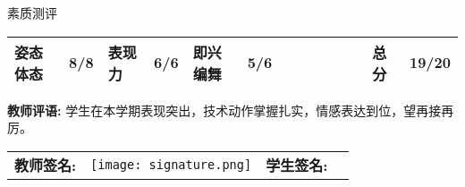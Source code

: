 \documentclass{article}
\begin{document}
\begin{CJK*}{UTF8}{gbsn}
\begin{center}
\begin{tabular}
\end{tabular}

\vspace{0.5cm}
素质测评
\vspace{0.3cm}

\begin{tabular}{|>{\normalsize}p{}>{\normalsize}p{}|>{\normalsize}p{}>{\normalsize}p{}|>{\normalsize}p{}>{\normalsize}p{}|>{\normalsize}p{}>{\normalsize}p{}|>{\normalsize}p{}>{\normalsize}p{}|>{\normalsize}p{}>{\normalsize}p{}|>{\normalsize}p{}>{\normalsize}p{}|}
    \hline
    \rule{0pt}{2.5ex}姿态体态 & 8/8 & 表现力 & 6/6 & 即兴编舞 & 5/6 &  &  &  &  &  &  & 总分 & \textbf{19/20}\\ \hline
    
\end{tabular}


\end{center}

\vspace{0.5cm}

\textbf{教师评语:} 学生在本学期表现突出，技术动作掌握扎实，情感表达到位，望再接再厉。

\vspace{0.5cm}


\begin{tabular}{llll}
    \textbf{教师签名:} & \texttt{[image: signature.png]} & \textbf{学生签名:} & \underline{\hspace{5cm}} \\
  
    \end{tabular}

    
\end{CJK*}
\end{document}
